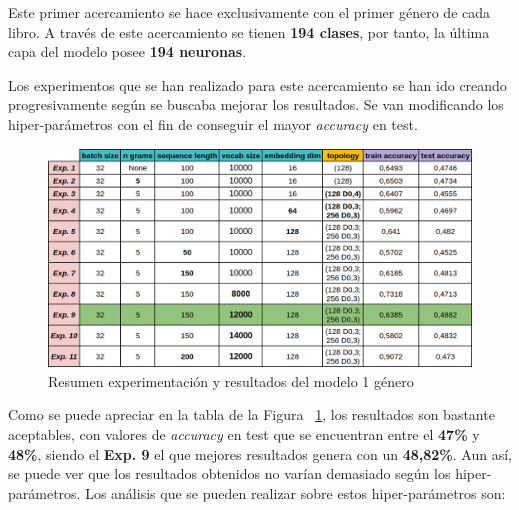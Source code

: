 \documentclass[12pt,a4paper, xcolor=table]{article}
\begin{document}
Este primer acercamiento se hace exclusivamente con el primer género de cada libro. A través de este acercamiento se tienen \textbf{194 clases}, por tanto, la última capa del modelo posee \textbf{194 neuronas}.

\vspace{2mm}

Los experimentos que se han realizado para este acercamiento se han ido creando progresivamente según se buscaba mejorar los resultados. Se van modificando los hiper-parámetros con el fin de conseguir el mayor \textit{accuracy} en test.

\vspace{2mm}

\begin{figure}[!h]
    \centering
    \includegraphics[width=500px]{img/one.png}
    \caption{Resumen experimentación y resultados del modelo 1 género}
    \label{fig:experimentos}
\end{figure}

Como se puede apreciar en la tabla de la Figura ~\ref{fig:experimentos}, los resultados son bastante aceptables, con valores de \textit{accuracy} en test que se encuentran entre el \textbf{47\%} y \textbf{48\%}, siendo el \textbf{Exp. 9} el que mejores resultados genera con un \textbf{48,82\%}. Aun así, se puede ver que los resultados obtenidos no varían demasiado según los hiper-parámetros. Los análisis que se pueden realizar sobre estos hiper-parámetros son:
\end{document}
